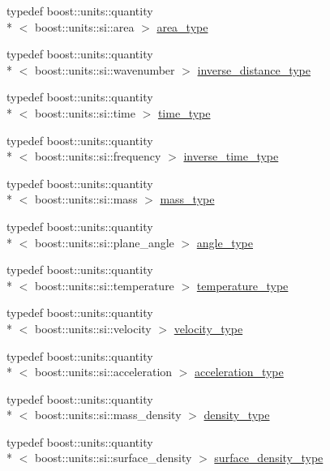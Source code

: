 \begin{DoxyCompactItemize}
\item 
typedef boost\-::units\-::quantity\\*
$<$ boost\-::units\-::si\-::area $>$ \hyperlink{namespaceIceBRG_afed43f9e24ef5cdea34327ea9e9b1b83}{area\-\_\-type}
\item 
typedef boost\-::units\-::quantity\\*
$<$ boost\-::units\-::si\-::wavenumber $>$ \hyperlink{namespaceIceBRG_a2d5122b3cac0d29c24c8b92645057638}{inverse\-\_\-distance\-\_\-type}
\item 
typedef boost\-::units\-::quantity\\*
$<$ boost\-::units\-::si\-::time $>$ \hyperlink{namespaceIceBRG_abf6c442a2e180ef52c5cefe18e47c327}{time\-\_\-type}
\item 
typedef boost\-::units\-::quantity\\*
$<$ boost\-::units\-::si\-::frequency $>$ \hyperlink{namespaceIceBRG_a92c76f9b2ac706653b9b12c36904712c}{inverse\-\_\-time\-\_\-type}
\item 
typedef boost\-::units\-::quantity\\*
$<$ boost\-::units\-::si\-::mass $>$ \hyperlink{namespaceIceBRG_a1be72ac4918a9b029f2eefa084213e35}{mass\-\_\-type}
\item 
typedef boost\-::units\-::quantity\\*
$<$ boost\-::units\-::si\-::plane\-\_\-angle $>$ \hyperlink{namespaceIceBRG_a688eeb0811a2474b20b667ed2e9625a1}{angle\-\_\-type}
\item 
typedef boost\-::units\-::quantity\\*
$<$ boost\-::units\-::si\-::temperature $>$ \hyperlink{namespaceIceBRG_afc3df702762e93c9a692609f0389d8d3}{temperature\-\_\-type}
\item 
typedef boost\-::units\-::quantity\\*
$<$ boost\-::units\-::si\-::velocity $>$ \hyperlink{namespaceIceBRG_a34f8ef3b46f3408301e3c28197095eff}{velocity\-\_\-type}
\item 
typedef boost\-::units\-::quantity\\*
$<$ boost\-::units\-::si\-::acceleration $>$ \hyperlink{namespaceIceBRG_ab10fe6d8fe6432a7dc0aa5a8ecac6a14}{acceleration\-\_\-type}
\item 
typedef boost\-::units\-::quantity\\*
$<$ boost\-::units\-::si\-::mass\-\_\-density $>$ \hyperlink{namespaceIceBRG_a9f5e5cdd641bb4c06f7305dfb5ae0238}{density\-\_\-type}
\item 
typedef boost\-::units\-::quantity\\*
$<$ boost\-::units\-::si\-::surface\-\_\-density $>$ \hyperlink{namespaceIceBRG_a80c597ef5ba0a32491d32a9f0083b02d}{surface\-\_\-density\-\_\-type}
\end{DoxyCompactItemize}
